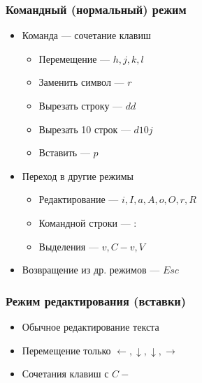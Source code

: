 \documentclass[aspectratio=169]{beamer}
\begin{document}
    \begin{frame}\frametitle{Командный (нормальный) режим}
        \begin{itemize}
            \item Команда --- сочетание клавиш
            \begin{itemize}
                \item Перемещение --- $h, j, k, l$
                \item Заменить символ --- $r$
                \item Вырезать строку --- $dd$
                \item Вырезать 10 строк --- $d10j$
                \item Вставить --- $p$
            \end{itemize}
            \item Переход в другие режимы
            \begin{itemize}
                \item Редактирование --- $i, I, a, A, o, O, r, R$
                \item Командной строки --- $:$
                \item Выделения --- $v, C-v, V$
            \end{itemize}
            \item Возвращение из др. режимов --- $Esc$
        \end{itemize}
    \end{frame}

    \begin{frame}\frametitle{Режим редактирования (вставки)}
        \begin{itemize}
            \item Обычное редактирование текста
            \item Перемещение только $\leftarrow, \downarrow, \downarrow, \rightarrow$
            \item Сочетания клавиш с $C-$
        \end{itemize}
    \end{frame}
\end{document}
